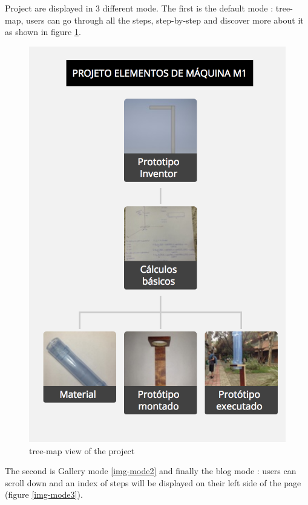 Project are displayed in 3 different mode.  The first is the default mode : tree-map, users can go through all the steps, step-by-step and discover more about it as shown in figure \ref{img-mode1}.
\begin{figure}[H]
	\centering
	\includegraphics[scale=.3]{./images/img-mode1.png}
	\caption{tree-map view of the project} 
	\label{img-mode1}
\end{figure}

The second is Gallery mode \ref{img-mode2} and finally  the  blog mode : users can scroll down and an index of steps will be displayed on their left side of the page (figure \ref{img-mode3}).

